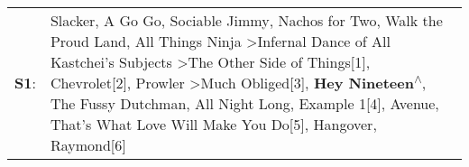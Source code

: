 \begin{supertabular}{p{0.03\textwidth}p{0.92\textwidth}}
 \textbf{S1}:  &  Slacker\textsuperscript{}, \enspace A Go Go\textsuperscript{}, \enspace Sociable Jimmy\textsuperscript{}, \enspace Nachos for Two\textsuperscript{}, \enspace Walk the Proud Land\textsuperscript{}, \enspace All Things Ninja\textsuperscript{} \textgreater \enspace Infernal Dance of All Kastchei's Subjects\textsuperscript{} \textgreater \enspace The Other Side of Things[1]\textsuperscript{}, \enspace Chevrolet[2]\textsuperscript{}, \enspace Prowler\textsuperscript{} \textgreater \enspace Much Obliged[3]\textsuperscript{}, \enspace \textbf{Hey Nineteen\textsuperscript{$\wedge$}}, \enspace The Fussy Dutchman\textsuperscript{}, \enspace All Night Long\textsuperscript{}, \enspace Example 1[4]\textsuperscript{}, \enspace Avenue\textsuperscript{}, \enspace That's What Love Will Make You Do[5]\textsuperscript{}, \enspace Hangover\textsuperscript{}, \enspace Raymond[6]\textsuperscript{}  \enspace  \\
\end{supertabular}
